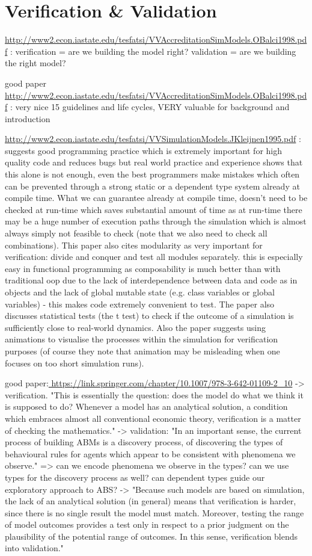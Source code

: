 \chapter{Verification \& Validation}
\url{http://www2.econ.iastate.edu/tesfatsi/VVAccreditationSimModels.OBalci1998.pdf} : verification = are we building the model right? validation = are we building the right model?

good paper \url{http://www2.econ.iastate.edu/tesfatsi/VVAccreditationSimModels.OBalci1998.pdf} : very nice 15 guidelines and life cycles, VERY valuable for background and introduction

\url{http://www2.econ.iastate.edu/tesfatsi/VVSimulationModels.JKleijnen1995.pdf} : suggests good programming practice which is extremely important for high quality code and reduces bugs but real world practice and experience shows that this alone is not enough, even the best programmers make mistakes which often can be prevented through a strong static or a dependent type system already at compile time. What we can guarantee already at compile time, doesn't need to be checked at run-time which saves substantial amount of time as at run-time there may be a huge number of execution paths through the simulation which is almost always simply not feasible to check (note that we also need to check all combinations). This paper also cites modularity as very important for verification: divide and conquer and test all modules separately. this is especially easy in functional programming as composability is much better than with traditional oop due to the lack of interdependence between data and code as in objects and the lack of global mutable state (e.g. class variables or global variables) - this makes code extremely convenient to test. The paper also discusses statistical tests (the t test) to check if the outcome of a simulation is sufficiently close to real-world dynamics. Also the paper suggests using animations to visualise the processes within the simulation for verification purposes (of course they note that animation may be misleading when one focuses on too short simulation runs).

good paper:\url{ https://link.springer.com/chapter/10.1007/978-3-642-01109-2_10}
	-> verification. "This is essentially the question: does the model do what we think it is supposed to do? Whenever a model has an analytical solution, a condition which embraces almost all conventional economic theory, verification is a matter of checking the mathematics."
	-> validation: "In an important sense, the current process of building ABMs is a discovery process, of discovering the types of behavioural rules for agents which appear to be consistent with phenomena we observe."
		=> can we encode phenomena we observe in the types? can we use types for the discovery process as well? can dependent types guide our exploratory approach to ABS?
	-> "Because such models are based on simulation, the lack of an analytical solution (in
general) means that verification is harder, since there is no single result the model
must match. Moreover, testing the range of model outcomes provides a test only in
respect to a prior judgment on the plausibility of the potential range of outcomes.
In this sense, verification blends into validation."

